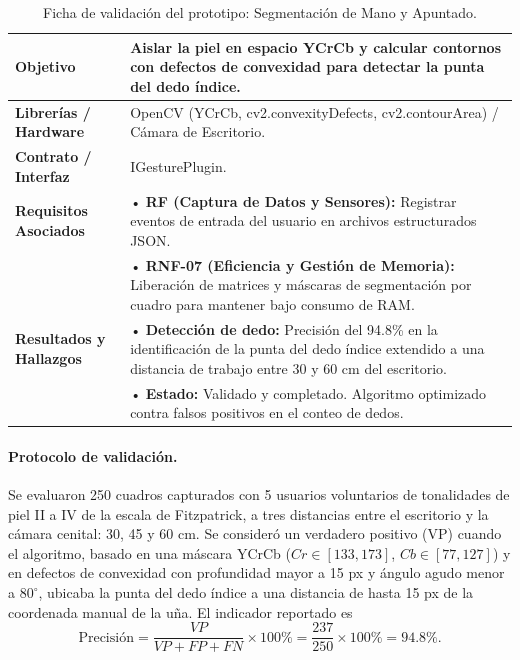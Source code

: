 \begin{table}[H]
    \centering
    \caption{Ficha de validación del prototipo: Segmentación de Mano y Apuntado.}
    \label{tab:ficha_f6}
    \begin{tabular}{|L{3.2cm}|L{11.0cm}|}
        \hline
        \textbf{Objetivo} & Aislar la piel en espacio YCrCb y calcular contornos con defectos de convexidad para detectar la punta del dedo índice. \\ \hline
        \textbf{Librerías / Hardware} & OpenCV (YCrCb, cv2.convexityDefects, cv2.contourArea) / Cámara de Escritorio. \\ \hline
        \textbf{Contrato / Interfaz} & IGesturePlugin. \\ \hline
        \textbf{Requisitos Asociados} &
        • \textbf{RF (Captura de Datos y Sensores):} Registrar eventos de entrada del usuario en archivos estructurados JSON. \vspace{0.1cm} \\
        & • \textbf{RNF-07 (Eficiencia y Gestión de Memoria):} Liberación de matrices y máscaras de segmentación por cuadro para mantener bajo consumo de RAM. \\ \hline
        \textbf{Resultados y Hallazgos} &
        • \textbf{Detección de dedo:} Precisión del 94.8\% en la identificación de la punta del dedo índice extendido a una distancia de trabajo entre 30 y 60 cm del escritorio. \vspace{0.1cm} \\
        & • \textbf{Estado:} Validado y completado. Algoritmo optimizado contra falsos positivos en el conteo de dedos. \\ \hline
    \end{tabular}
\end{table}
 
\paragraph{Protocolo de validación.} Se evaluaron 250 cuadros capturados con 5 usuarios voluntarios de tonalidades de piel II a IV de la escala de Fitzpatrick, a tres distancias entre el escritorio y la cámara cenital: 30, 45 y 60 cm. Se consideró un verdadero positivo (VP) cuando el algoritmo, basado en una máscara YCrCb ($Cr \in [133, 173]$, $Cb \in [77, 127]$) y en defectos de convexidad con profundidad mayor a 15 px y ángulo agudo menor a $80^\circ$, ubicaba la punta del dedo índice a una distancia de hasta 15 px de la coordenada manual de la uña. El indicador reportado es
\[ \mathrm{Precisión} = \frac{VP}{VP + FP + FN} \times 100\% = \frac{237}{250} \times 100\% = 94.8\%. \]
 
